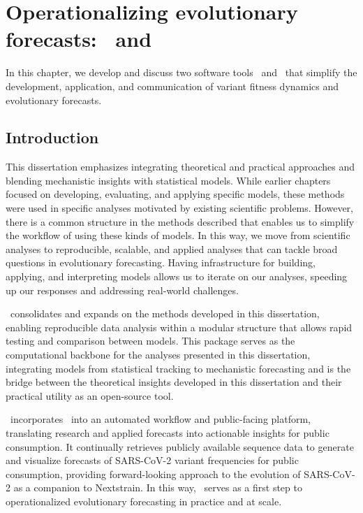 \graphicspath{{./chapters/operationalizing-forecasts/}}
\chapter{Operationalizing evolutionary forecasts: \evofr\ and \forecastsNcov}

In this chapter, we develop and discuss two software tools \evofr\ and \forecastsNcov\ that simplify the development, application, and communication of variant fitness dynamics and evolutionary forecasts.

\section{Introduction}

This dissertation emphasizes integrating theoretical and practical approaches and blending mechanistic insights with statistical models.
While earlier chapters focused on developing, evaluating, and applying specific models, these methods were used in specific analyses motivated by existing scientific problems.
However, there is a common structure in the methods described that enables us to simplify the workflow of using these kinds of models.
In this way, we move from scientific analyses to reproducible, scalable, and applied analyses that can tackle broad questions in evolutionary forecasting. %
Having infrastructure for building, applying, and interpreting models allows us to iterate on our analyses, speeding up our responses and addressing real-world challenges.



\evofr\ consolidates and expands on the methods developed in this dissertation, enabling reproducible data analysis within a modular structure that allows rapid testing and comparison between models. %
This package serves as the computational backbone for the analyses presented in this dissertation, integrating models from statistical tracking to mechanistic forecasting and is the bridge between the theoretical insights developed in this dissertation and their practical utility as an open-source tool. 

\forecastsNcov\ incorporates \evofr\ into an automated workflow and public-facing platform, translating research and applied forecasts into actionable insights for public consumption.
It continually retrieves publicly available sequence data to generate and visualize forecasts of SARS-CoV-2 variant frequencies for public consumption, providing forward-looking approach to the evolution of SARS-CoV-2 as a companion to Nextstrain. \cite{Hadfield2018}
In this way, \forecastsNcov\ serves as a first step to operationalized evolutionary forecasting in practice and at scale.

